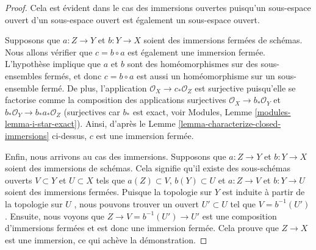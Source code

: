 \begin{proof}
Cela est évident dans le cas des immersions ouvertes puisqu'un sous-espace ouvert
d'un sous-espace ouvert est également un sous-espace ouvert.

\medskip\noindent
Supposons que  $a : Z \to Y$  et  $b : Y \to X$  soient des immersions fermées de
schémas. Nous allons vérifier que  $c = b \circ a$  est également une immersion fermée.
L'hypothèse implique que  $a$  et  $b$  sont des homéomorphismes sur
des sous-ensembles fermés, et donc  $c = b \circ a$  est aussi un homéomorphisme sur un
sous-ensemble fermé. De plus, l'application  $\mathcal{O}_X \to c_*\mathcal{O}_Z$  est surjective
puisqu'elle se factorise comme la composition des applications surjectives
 $\mathcal{O}_X \to b_*\mathcal{O}_Y$  et  $b_*\mathcal{O}_Y \to b_*a_*\mathcal{O}_Z$  (surjectives car  $b_*$  est exact, voir
Modules, Lemme  \ref{modules-lemma-i-star-exact}). Ainsi, d'après le Lemme  \ref{lemma-characterize-closed-immersions}  ci-dessus,
 $c$  est une immersion fermée.

\medskip\noindent
Enfin, nous arrivons au cas des immersions. Supposons que  $a : Z \to Y$  et
 $b : Y \to X$  soient des immersions de schémas. Cela signifie qu’il existe des
sous-schémas ouverts  $V \subset Y$  et  $U \subset X$  tels que  $a(Z) \subset V$,
 $b(Y) \subset U$  et  $a : Z \to V$  et  $b : Y \to U$  soient des immersions fermées.
Puisque la topologie sur  $Y$  est induite à partir de la topologie sur
 $U$ , nous pouvons trouver un ouvert  $U' \subset U$  tel que  $V = b^{-1}(U')$.
Ensuite, nous voyons que  $Z \to V = b^{-1}(U') \to U'$  est une composition d’immersions fermées et
est donc une immersion fermée. Cela prouve que  $Z \to X$  est une immersion, ce qui achève la démonstration.
\end{proof}

















